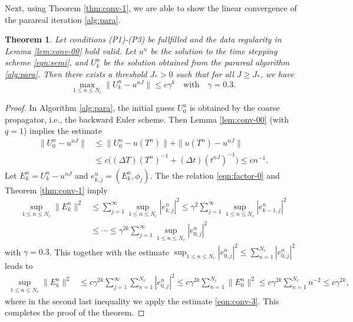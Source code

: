 \documentclass[a4paper, oneside]{book}
\newtheorem{theorem}{Theorem}[section]
\begin{document}
Next, using Theorem \ref{thm:conv-1}, we are able to show the linear convergence of the parareal iteration \ref{alg:para}.

\begin{theorem}\label{thm:conv-2}
Let conditions (P1)-(P3) be fullfilled and the data regularity in Lemma \ref{lem:conv-00} hold valid. Let $u^n$ be the solution to the time stepping scheme \eqref{eqn:semi},
and $U_k^n$ be the solution obtained from the parareal algorithm \ref{alg:para}.  Then there exists a threshold $J_*>0$ such that
for all $J\ge J_*$,
 we have
$$ \max_{1 \le n\le N_c} \| U_k^n - u^{nJ} \|  \le c \gamma^k\quad \text{with} \quad \gamma=0.3.$$
\end{theorem}

\begin{proof}
In Algorithm \ref{alg:para}, the initial guess $U_0^n$ is obtained by the coarse propagator, i.e., the backward Euler scheme.
Then Lemma \ref{lem:conv-00} (with $q=1$) implies the estimate
\begin{equation}\label{eqn:conv-3}
\begin{aligned}
 \| U_0^n - u^{nJ} \| &\le \| U_0^n - u(T^n)\|  + \|u(T^n)- u^{nJ} \| \\
 &\le c \big((\Delta T) {(T^n)}^{-1} + (\Delta t) {(t^{nJ})}^{-1} \big)\le c n^{-1}.
\end{aligned}
\end{equation}
Let $E_k^n =U_k^n - u^{nJ}$ and $e_{k,j}^n = (E_k^n, \phi_j)$. The the relation \eqref{eqn:factor-0} and
Theorem \ref{thm:conv-1} imply
\begin{equation*}
\begin{aligned}
\sup_{1\le n\le N_c} \|  E_k^n \|^2
& \le  \sum_{j=1}^\infty \sup_{1\le n\le N_c} | e_{k,j}^n |^2 \le \gamma^2  \sum_{j=1}^\infty \sup_{1\le n\le N_c} | e_{k-1,j}^n |^2\\
& \le \cdots     \le \gamma^{2k}  \sum_{j=1}^\infty \sup_{1\le n\le N_c} | e_{0,j}^n |^2
    \end{aligned}
\end{equation*}
with $\gamma = 0.3$. This together with the estimate
$
  \sup_{1\le n\le N_c} | e_{0,j}^n |^2 %
   \le  \sum_{n=1}^{N_c} | e_{0,j}^n |^2
$
leads to
\begin{equation*}
\begin{aligned}
\sup_{1\le n\le N_c} \|  E_k^n \|^2  &\le c \gamma^{2k}  \sum_{j=1}^\infty  \sum_{n=1}^{N_c} | e_{0,j}^n |^2
 \le  c \gamma^{2k}   \sum_{n=1}^{N_c} \| E_{0}^n \|^2
  \le  c \gamma^{2k}   \sum_{n=1}^{N_c} n^{-2}
 \le c \gamma^{2k} ,
    \end{aligned}
\end{equation*}
where in the second last inequality we apply the estimate \eqref{eqn:conv-3}.
 This completes the proof of the theorem.
\end{proof}
\end{document}
